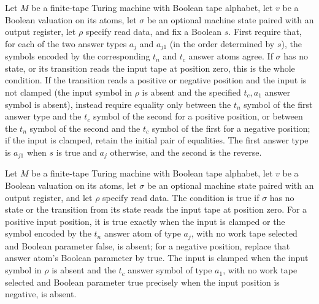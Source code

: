 \begin{definition}
\label{Complexity.Meyer.inOK}
\leanok
{}
Let $M$ be a finite-tape Turing machine with Boolean tape alphabet, let $v$ be a Boolean
valuation on its atoms, let $\sigma$ be an optional machine state paired with an output
register, let $\rho$ specify read data, and fix a Boolean $s$. First require that, for
each of the two answer types $a_j$ and $a_{j1}$ (in the order determined by $s$), the
symbols encoded by the corresponding $t_n$ and $t_c$ answer atoms agree. If $\sigma$ has
no state, or its transition reads the input tape at position zero, this is the whole
condition. If the transition reads a positive or negative position and the input is not
clamped (the input symbol in $\rho$ is absent and the specified $t_c,a_1$ answer symbol
is absent), instead require equality only between the $t_n$ symbol of the first answer
type and the $t_c$ symbol of the second for a positive position, or between the $t_n$
symbol of the second and the $t_c$ symbol of the first for a negative position; if the
input is clamped, retain the initial pair of equalities. The first answer type is
$a_{j1}$ when $s$ is true and $a_j$ otherwise, and the second is the reverse.
\end{definition}

\begin{definition}
\label{Complexity.Meyer.bdOK}
\leanok
{}
Let $M$ be a finite-tape Turing machine with Boolean tape alphabet, let $v$ be a Boolean
valuation on its atoms, let $\sigma$ be an optional machine state paired with an output
register, and let $\rho$ specify read data. The condition is true if $\sigma$ has no
state or the transition from its state reads the input tape at position zero. For a
positive input position, it is true exactly when the input is clamped or the symbol
encoded by the $t_n$ answer atom of type $a_j$, with no work tape selected and Boolean
parameter false, is absent; for a negative position, replace that answer atom's Boolean
parameter by true. The input is clamped when the input symbol in $\rho$ is absent and
the $t_c$ answer symbol of type $a_1$, with no work tape selected and Boolean parameter
true precisely when the input position is negative, is absent.
\end{definition}

